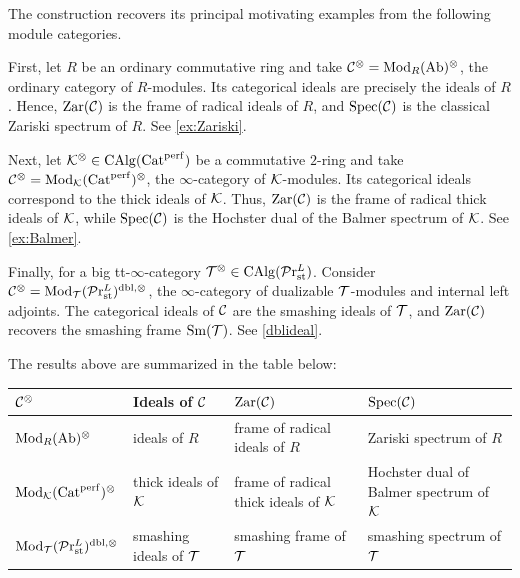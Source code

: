 \documentclass[10pt,a4paper,oneside]{article}
\begin{document}
The construction recovers its principal motivating examples from the following module categories.

First, let $R$ be an ordinary commutative ring and take $\mathcal{C}^\otimes = \operatorname{Mod}_{R}(\operatorname{Ab})^\otimes$, the ordinary category of $R$-modules. Its categorical ideals are precisely the ideals of $R$. Hence, $\operatorname{Zar}(\mathcal{C})$ is the frame of radical ideals of $R$, and $\operatorname{Spec}(\mathcal{C})$ is the classical Zariski spectrum of $R$. See \cref{ex:Zariski}.

Next, let $\mathcal{K}^\otimes \in \operatorname{CAlg}(\operatorname{Cat}^{\operatorname{perf}})$ be a commutative $2$-ring and take $\mathcal{C}^\otimes = \operatorname{Mod}_{\mathcal{K}}(\operatorname{Cat}^{\operatorname{perf}})^\otimes$, the $\infty$-category of $\mathcal{K}$-modules. Its categorical ideals correspond to the thick ideals of $\mathcal{K}$. Thus, $\operatorname{Zar}(\mathcal{C})$ is the frame of radical thick ideals of $\mathcal{K}$, while $\operatorname{Spec}(\mathcal{C})$ is the Hochster dual of the Balmer spectrum of $\mathcal{K}$. See \cref{ex:Balmer}.

Finally, for a big tt-$\infty$-category $\mathcal{T}^\otimes\in\operatorname{CAlg}(\mathcal{P}\mathrm{r}_{\operatorname{st}}^L)$. Consider $\mathcal{C}^\otimes = \operatorname{Mod}_\mathcal{T}(\mathcal{P}\mathrm{r}_{\operatorname{st}}^L)^{\operatorname{dbl},\otimes}$, the $\infty$-category of dualizable $\mathcal{T}$-modules and internal left adjoints. The categorical ideals of $\mathcal{C}$ are the smashing ideals of $\mathcal{T}$, and $\operatorname{Zar}(\mathcal{C})$ recovers the smashing frame $\operatorname{Sm}(\mathcal{T})$. See \cref{dblideal}.

The results above are summarized in the table below:
\begin{center}
\begin{tabularx}{\textwidth}{p{2.5cm} p{3cm} X X}
\toprule
$\mathcal{C}^\otimes$ 
& Ideals of $\mathcal{C}$
& $\operatorname{Zar}(\mathcal{C})$
& $\operatorname{Spec}(\mathcal{C})$\\
\midrule

$\operatorname{Mod}_{R}(\operatorname{Ab})^\otimes$ 
& ideals of $R$ 
& frame of radical ideals of $R$
& Zariski spectrum of $R$\\

\addlinespace

$\operatorname{Mod}_{\mathcal{K}}(\operatorname{Cat}^{\operatorname{perf}})^\otimes$ 
& thick ideals of $\mathcal{K}$ 
& frame of radical thick ideals of $\mathcal{K}$
& Hochster dual of Balmer spectrum of $\mathcal{K}$ \\

\addlinespace

$\operatorname{Mod}_\mathcal{T}(\mathcal{P}\mathrm{r}_{\operatorname{st}}^L)^{\operatorname{dbl},\otimes}$ 
& smashing ideals of $\mathcal{T}$
& smashing frame of $\mathcal{T}$
& smashing spectrum of $\mathcal{T}$\\

\bottomrule
\end{tabularx}
\end{center}
\end{document}
